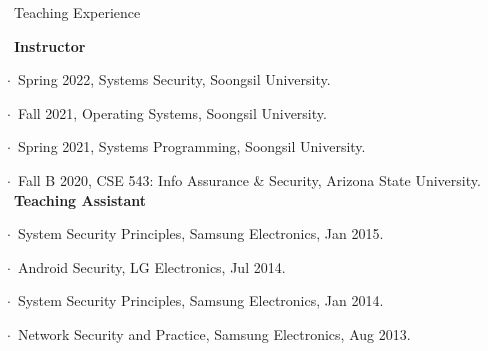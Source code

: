 \documentclass{resume} %
\begin{document}
\begin{rSection}{\faGenderless~Teaching Experience}

    \textbullet~{\bf Instructor} \\
        \strut\hspace{1cm}$\cdot$~Spring 2022, Systems Security, Soongsil University.\\
        \strut\hspace{1cm}$\cdot$~Fall 2021, Operating Systems, Soongsil University.\\
        \strut\hspace{1cm}$\cdot$~Spring 2021, Systems Programming, Soongsil University.\\
        \strut\hspace{1cm}$\cdot$~Fall B 2020, CSE 543: Info Assurance \& Security, Arizona State University.\\

	\textbullet~{\bf Teaching Assistant} \\
		\strut\hspace{1cm}$\cdot$~System Security Principles, Samsung Electronics, Jan 2015.\\
		\strut\hspace{1cm}$\cdot$~Android Security, LG Electronics, Jul 2014.\\
		\strut\hspace{1cm}$\cdot$~System Security Principles, Samsung Electronics, Jan 2014.\\
		\strut\hspace{1cm}$\cdot$~Network Security and Practice, Samsung Electronics, Aug 2013.

	\vspace{3mm}
\end{rSection}	

%
\end{document}

